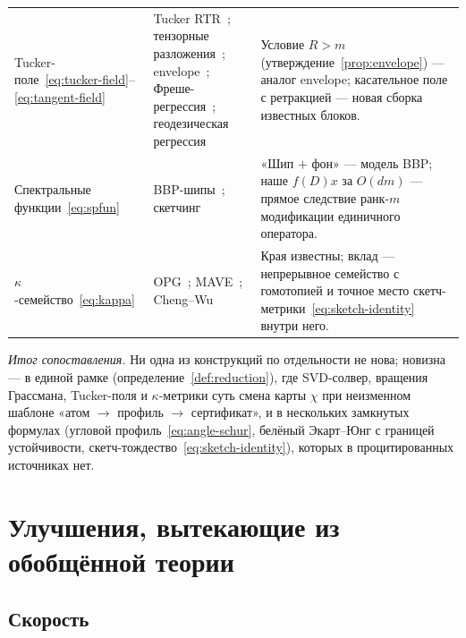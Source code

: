 \documentclass[11pt,a4paper]{article}
\theoremstyle{plain}
\theoremstyle{definition}
\theoremstyle{remark}
\begin{document}
\begin{center}
\begin{tabularx}{\textwidth}{@{}p{3.6cm}p{4.6cm}X@{}}
Tucker-поле~\eqref{eq:tucker-field}--\eqref{eq:tangent-field}
& Tucker RTR~\cite{ishteva-2011};
тензорные разложения~\cite{kolda-bader-2009};
envelope~\cite{cook-2010-envelope};
Фреше-регрессия~\cite{petersen-mueller-2019};
геодезическая регрессия~\cite{fletcher-2011,hong-grassmann-regression}
& Условие $R>m$ (утверждение~\ref{prop:envelope}) --- аналог envelope;
касательное поле с ретракцией --- новая сборка известных блоков.\\[2pt]
Спектральные функции~\eqref{eq:spfun}
& BBP-шипы~\cite{baik-2005-bbp,johnstone-2001};
скетчинг~\cite{halko-2011,pilanci-wainwright}
& «Шип + фон» --- модель BBP; наше $f(D)x$ за $O(dm)$ --- прямое следствие
ранк-$m$ модификации единичного оператора.\\[2pt]
$\kappa$-семейство~\eqref{eq:kappa}
& OPG~\cite{hjps-2001}; MAVE~\cite{xia-2002-mave};
Cheng--Wu~\cite{cheng-wu-2013}
& Края известны; вклад --- непрерывное семейство с гомотопией и точное
место скетч-метрики~\eqref{eq:sketch-identity} внутри него.\\
\bottomrule
\end{tabularx}
\end{center}

\medskip
\noindent\emph{Итог сопоставления.} Ни одна из конструкций по отдельности не нова;
новизна --- в единой рамке (определение~\ref{def:reduction}), где SVD-солвер,
вращения Грассмана, Tucker-поля и $\kappa$-метрики суть смена карты $\chi$ при
неизменном шаблоне «атом $\to$ профиль $\to$ сертификат», и в нескольких
замкнутых формулах (угловой профиль~\eqref{eq:angle-schur}, белёный
Экарт--Юнг с границей устойчивости, скетч-тождество~\eqref{eq:sketch-identity}),
которых в процитированных источниках нет.

\section{Улучшения, вытекающие из обобщённой теории}\label{sec:improve}

\subsection{Скорость}
\end{document}
